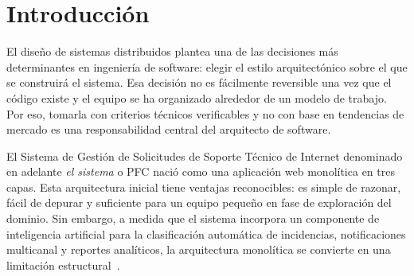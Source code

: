 \documentclass[12pt, a4paper]{article}
\begin{document}
\begin{abstract}
\noindent
El presente informe desarrolla un análisis comparativo entre la Arquitectura
Orientada a Servicios (SOA) y la arquitectura de microservicios, con el objetivo
de fundamentar la decisión de diseño adoptada en el Proyecto Fin de Curso (PFC):
el Sistema de Gestión de Solicitudes de Soporte Técnico de Internet. El sistema
evolucionó desde una arquitectura en tres capas esencialmente monolítica---
hacia un ecosistema de cinco microservicios desacoplados, comunicados mediante
REST síncrono y Apache Kafka asíncrono. Se examinan los principios fundacionales
de cada estilo, sus atributos de calidad bajo el marco ISO/IEC~25010 y las
condiciones concretas que determinan la aplicabilidad de uno u otro. Los hallazgos
demuestran que la adopción de microservicios en lugar de SOA responde a tres
restricciones verificables del proyecto: fronteras de dominio bien delimitadas
por diseño guiado por el dominio (DDD), disponibilidad de infraestructura de
contenedores y ausencia de sistemas heterogéneos preexistentes que justifiquen
un ESB. Se concluye que los microservicios con mensajería orientada a eventos
satisfacen los requisitos de escalabilidad, tolerancia a fallos y desplegabilidad
independiente exigidos por el dominio de soporte técnico, mientras que SOA
habría introducido complejidad sin resolver ningún problema real del sistema.

\medskip
\noindent\textbf{Palabras clave:} arquitectura distribuida, SOA, microservicios,
ESB, API Gateway, Apache Kafka, DDD, bounded context, Circuit Breaker, Saga,
atributos de calidad, soporte técnico.
\end{abstract}

\newpage
\tableofcontents
\newpage

\section{Introducción}
\label{sec:intro}

El diseño de sistemas distribuidos plantea una de las decisiones más determinantes
en ingeniería de software: elegir el estilo arquitectónico sobre el que se
construirá el sistema. Esa decisión no es fácilmente reversible una vez que el
código existe y el equipo se ha organizado alrededor de un modelo de trabajo.
Por eso, tomarla con criterios técnicos verificables y no con base en
tendencias de mercado es una responsabilidad central del arquitecto de software.

El Sistema de Gestión de Solicitudes de Soporte Técnico de Internet denominado
en adelante \textit{el sistema} o PFC nació como una aplicación web monolítica
en tres capas. Esta arquitectura inicial tiene ventajas reconocibles: es simple de
razonar, fácil de depurar y suficiente para un equipo pequeño en fase de exploración
del dominio. Sin embargo, a medida que el sistema incorpora un componente de
inteligencia artificial para la clasificación automática de incidencias, notificaciones
multicanal y reportes analíticos, la arquitectura monolítica se convierte en una
limitación estructural~\cite{blinowski2022}.
\end{document}
